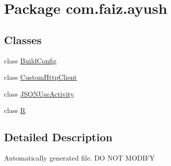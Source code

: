 \hypertarget{namespacecom_1_1faiz_1_1ayush}{}\section{Package com.\+faiz.\+ayush}
\label{namespacecom_1_1faiz_1_1ayush}
\subsection*{Classes}
\begin{DoxyCompactItemize}
\item 
class \hyperlink{classcom_1_1faiz_1_1ayush_1_1_build_config}{Build\+Config}
\item 
class \hyperlink{classcom_1_1faiz_1_1ayush_1_1_custom_http_client}{Custom\+Http\+Client}
\item 
class \hyperlink{classcom_1_1faiz_1_1ayush_1_1_j_s_o_n_use_activity}{J\+S\+O\+N\+Use\+Activity}
\item 
class \hyperlink{classcom_1_1faiz_1_1ayush_1_1_r}{R}
\end{DoxyCompactItemize}


\subsection{Detailed Description}
Automatically generated file. D\+O N\+O\+T M\+O\+D\+I\+F\+Y 